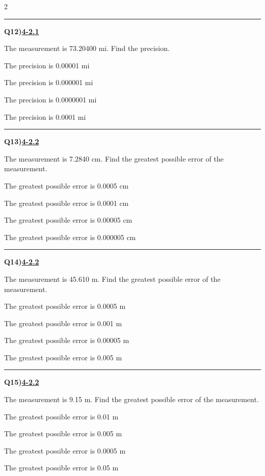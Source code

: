 \documentclass[11pt]{article}
\newenvironment{Qbox}[2]{%
  \par\medskip\noindent\begin{minipage}{\linewidth}%
  \hrule\medskip%
  \textbf{Q#1)}\hfill\textbf{\underline{#2}}\par\smallskip%
}{\par\end{minipage}\par\medskip}
\begin{document}
\begin{multicols}{2}
\begin{Qbox}{12}{4-2.1}
The measurement is 73.20400 mi. Find the precision.
\begin{choices}
  \item The precision is 0.00001 mi
  \item The precision is 0.000001 mi
  \item The precision is 0.0000001 mi
  \item The precision is 0.0001 mi
\end{choices}
\end{Qbox}

\begin{Qbox}{13}{4-2.2}
The measurement is 7.2840 cm. Find the greatest possible error of the measurement.
\begin{choices}
  \item The greatest possible error is 0.0005 cm
  \item The greatest possible error is 0.0001 cm
  \item The greatest possible error is 0.00005 cm
  \item The greatest possible error is 0.000005 cm
\end{choices}
\end{Qbox}

\begin{Qbox}{14}{4-2.2}
The measurement is 45.610 m. Find the greatest possible error of the measurement.
\begin{choices}
  \item The greatest possible error is 0.0005 m
  \item The greatest possible error is 0.001 m
  \item The greatest possible error is 0.00005 m
  \item The greatest possible error is 0.005 m
\end{choices}
\end{Qbox}

\begin{Qbox}{15}{4-2.2}
The measurement is 9.15 m. Find the greatest possible error of the measurement.
\begin{choices}
  \item The greatest possible error is 0.01 m
  \item The greatest possible error is 0.005 m
  \item The greatest possible error is 0.0005 m
  \item The greatest possible error is 0.05 m
\end{choices}
\end{Qbox}


\end{multicols}
\end{document}
